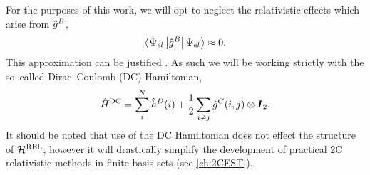 For the purposes of this work, we will opt to neglect the relativistic effects which arise from $\hat{g}^B$,
\begin{equation}
  \left\langle \Psi_{el} \left\vert \hat{g}^B \right\vert \Psi_{el} \right\rangle \approx 0.
\end{equation}
This approximation can be justified . As such we will be working strictly with the so--called
Dirac--Coulomb (DC) Hamiltonian,
\begin{equation}
  \hat{H}^{\mathrm{DC}} = \sum_i^N  \hat{h}^D(i) + \frac{1}{2} \sum_{i \neq j}\hat{g}^C(i,j) \otimes \boldsymbol{I}_2. 
\end{equation}
It should be noted that use of the DC Hamiltonian does not effect the structure of $\mathcal{H}^{\mathrm{REL}}$,
however it will drastically simplify the development of practical 2C relativistic methods
in finite basis sets (see \cref{ch:2CEST}).













